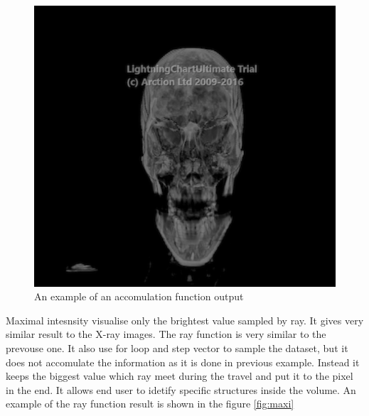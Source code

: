 \documentclass[twoside, english, 11pt]{report}
\begin{document}
\begin{figure}[!h]
\centerline{\includegraphics[scale = 0.6]{img/accum}}
\caption{An example of an accomulation function output\label{fig:accum}}
\end{figure}

Maximal intesnsity visualise only the brightest value sampled by ray. It gives very similar result to the X-ray images. The ray function is very similar to the prevouse one. It also use for loop and step vector to sample the dataset, but it does not accomulate the information as it is done in previous example. Instead it keeps the biggest value which ray meet during the travel and put it to the pixel in the end. It allows end user to idetify specific structures inside the volume. An example of the ray function result is shown in the figure \ref{fig:maxi}
\end{document}
